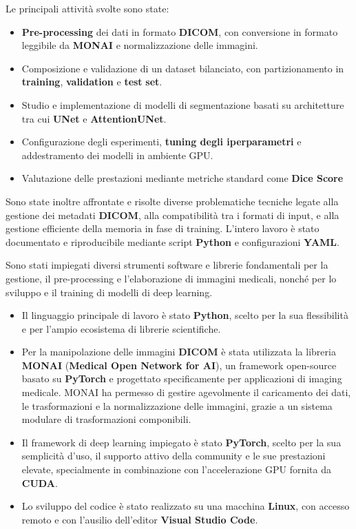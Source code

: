 Le principali attività svolte sono state:
\begin{itemize}
    \item \textbf{Pre-processing} dei dati in formato \textbf{DICOM}, con conversione in formato leggibile da \textbf{MONAI} e normalizzazione delle immagini.
    \item Composizione e validazione di un dataset bilanciato, con partizionamento in \textbf{training}, \textbf{validation} e \textbf{test} \textbf{set}.
    \item Studio e implementazione di modelli di segmentazione basati su architetture tra cui \textbf{UNet} e \textbf{AttentionUNet}.
    \item Configurazione degli esperimenti, \textbf{tuning degli iperparametri} e addestramento dei modelli in ambiente GPU.
    \item Valutazione delle prestazioni mediante metriche standard come \textbf{Dice Score}
\end{itemize}

Sono state inoltre affrontate e risolte diverse problematiche tecniche legate alla gestione dei metadati \textbf{DICOM}, alla compatibilità tra i formati di input, e alla gestione efficiente della memoria in fase di training. L'intero lavoro è stato documentato e riproducibile mediante script \textbf{Python} e configurazioni \textbf{YAML}.


	
Sono stati impiegati diversi strumenti software e librerie  fondamentali per la gestione, il pre-processing e l'elaborazione di immagini medicali, nonché per lo sviluppo e il training di modelli di deep learning.
\begin{itemize}
	\item  Il linguaggio principale di lavoro è stato \textbf{Python}, scelto per la sua flessibilità e per l'ampio ecosistema di librerie scientifiche.
	\item Per la manipolazione delle immagini \textbf{DICOM} è stata utilizzata la libreria \textbf{MONAI} (\textbf{Medical Open Network for AI}), un framework open-source basato su \textbf{PyTorch} e progettato specificamente per applicazioni di imaging medicale. MONAI ha permesso di gestire agevolmente il caricamento dei dati, le trasformazioni e la normalizzazione delle immagini, grazie a un sistema modulare di trasformazioni componibili.
	\item Il framework di deep learning impiegato è stato \textbf{PyTorch}, scelto per la sua semplicità d'uso, il supporto attivo della community e le sue prestazioni elevate, specialmente in combinazione con l'accelerazione GPU fornita da \textbf{CUDA}.
	\item Lo sviluppo del codice è stato realizzato su una macchina \textbf{Linux}, con accesso remoto e con l'ausilio dell'editor \textbf{Visual Studio Code}.
\end{itemize}


